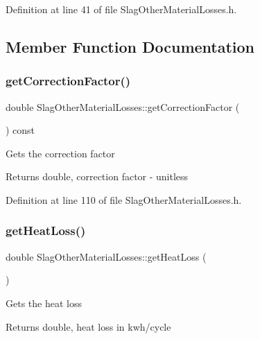 Definition at line 41 of file Slag\+Other\+Material\+Losses.\+h.



\subsection{Member Function Documentation}
\mbox{\label{class_slag_other_material_losses_a920bbc2da2ba90416e86573830eee2cb}} 
\subsubsection{\texorpdfstring{get\+Correction\+Factor()}{getCorrectionFactor()}}
{\footnotesize\ttfamily double Slag\+Other\+Material\+Losses\+::get\+Correction\+Factor (\begin{DoxyParamCaption}{ }\end{DoxyParamCaption}) const\hspace{0.3cm}{\ttfamily [inline]}}

Gets the correction factor \begin{DoxyReturn}{Returns}
double, correction factor -\/ unitless 
\end{DoxyReturn}


Definition at line 110 of file Slag\+Other\+Material\+Losses.\+h.

\mbox{\label{class_slag_other_material_losses_a4c96a826ef6da38f4c27f7efd8b4a7ba}} 
\subsubsection{\texorpdfstring{get\+Heat\+Loss()}{getHeatLoss()}}
{\footnotesize\ttfamily double Slag\+Other\+Material\+Losses\+::get\+Heat\+Loss (\begin{DoxyParamCaption}{ }\end{DoxyParamCaption})}

Gets the heat loss \begin{DoxyReturn}{Returns}
double, heat loss in kwh/cycle 
\end{DoxyReturn}


